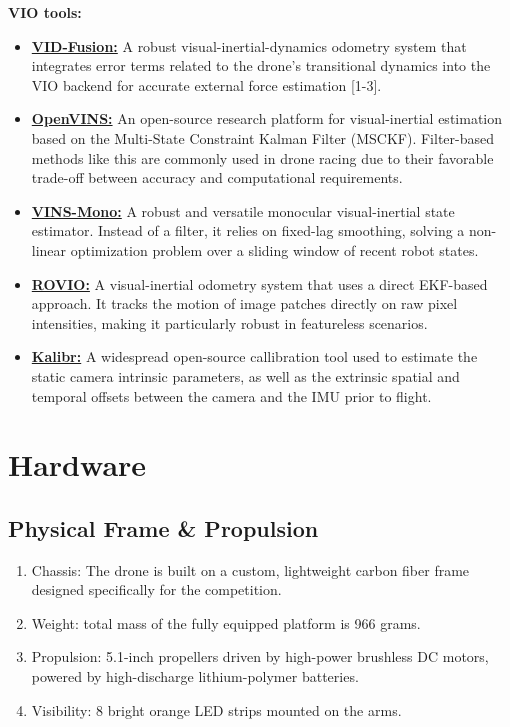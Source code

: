 \documentclass{article}
\begin{document}
\textbf{VIO tools:}
\begin{itemize}
    \item \href{https://github.com/ZJU-FAST-Lab/VID-Fusion}{\textbf{VID-Fusion:}} A robust visual-inertial-dynamics odometry system that integrates error terms related to the drone's transitional dynamics into the VIO backend for accurate external force estimation [1-3].
    \item \href{https://docs.openvins.com/}{\textbf{OpenVINS:}} An open-source research platform for visual-inertial estimation based on the Multi-State Constraint Kalman Filter (MSCKF). Filter-based methods like this are commonly used in drone racing due to their favorable trade-off between accuracy and computational requirements.
    \item \href{https://github.com/HKUST-Aerial-Robotics/VINS-Mono}{\textbf{VINS-Mono:}} A robust and versatile monocular visual-inertial state estimator. Instead of a filter, it relies on fixed-lag smoothing, solving a non-linear optimization problem over a sliding window of recent robot states.
    \item \href{https://github.com/ethz-asl/rovio}{\textbf{ROVIO:}} A visual-inertial odometry system that uses a direct EKF-based approach. It tracks the motion of image patches directly on raw pixel intensities, making it particularly robust in featureless scenarios.
    \item \href{https://github.com/ethz-asl/kalibr}{\textbf{Kalibr:}} A widespread open-source callibration tool used to estimate the static camera intrinsic parameters, as well as the extrinsic spatial and temporal offsets between the camera and the IMU prior to flight.
\end{itemize}

\section{Hardware}

\subsection{Physical Frame \& Propulsion}
\begin{enumerate}
    \item Chassis: The drone is built on a custom, lightweight carbon fiber frame designed specifically for the competition.
    \item Weight: total mass of the fully equipped platform is 966 grams.
    \item Propulsion: 5.1-inch propellers driven by high-power brushless DC motors, powered by high-discharge lithium-polymer batteries.
    \item Visibility: 8 bright orange LED strips mounted on the arms.
\end{enumerate}
\end{document}
